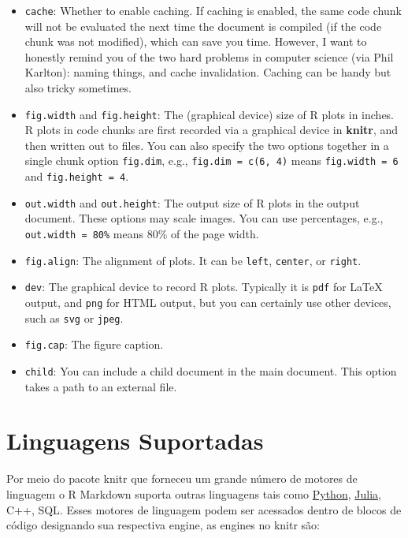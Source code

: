 \documentclass[
]{book}
\begin{document}
\begin{itemize}
\item
  \texttt{cache}: Whether to enable caching. If caching is enabled, the same code chunk will not be evaluated the next time the document is compiled (if the code chunk was not modified), which can save you time. However, I want to honestly remind you of the two hard problems in computer science (via Phil Karlton): naming things, and cache invalidation. Caching can be handy but also tricky sometimes.
\item
  \texttt{fig.width} and \texttt{fig.height}: The (graphical device) size of R plots in inches. R plots in code chunks are first recorded via a graphical device in \textbf{knitr}, and then written out to files. You can also specify the two options together in a single chunk option \texttt{fig.dim}, e.g., \texttt{fig.dim\ =\ c(6,\ 4)} means \texttt{fig.width\ =\ 6} and \texttt{fig.height\ =\ 4}.
\item
  \texttt{out.width} and \texttt{out.height}: The output size of R plots in the output document. These options may scale images. You can use percentages, e.g., \texttt{out.width\ =\ \textquotesingle{}80\%\textquotesingle{}} means 80\% of the page width.
\item
  \texttt{fig.align}: The alignment of plots. It can be \texttt{\textquotesingle{}left\textquotesingle{}}, \texttt{\textquotesingle{}center\textquotesingle{}}, or \texttt{\textquotesingle{}right\textquotesingle{}}.
\item
  \texttt{dev}: The graphical device to record R plots. Typically it is \texttt{\textquotesingle{}pdf\textquotesingle{}} for LaTeX output, and \texttt{\textquotesingle{}png\textquotesingle{}} for HTML output, but you can certainly use other devices, such as \texttt{\textquotesingle{}svg\textquotesingle{}} or \texttt{\textquotesingle{}jpeg\textquotesingle{}}.
\item
  \texttt{fig.cap}: The figure caption.
\item
  \texttt{child}: You can include a child document in the main document. This option takes a path to an external file.
\end{itemize}

\hypertarget{linguagens-suportadas}{%
\section{Linguagens Suportadas}\label{linguagens-suportadas}}

Por meio do pacote knitr que forneceu um grande número de motores de linguagem o R Markdown suporta outras linguagens tais como \href{https://www.python.org/}{Python}, \href{https://julialang.org/}{Julia}, C++, SQL. Esses motores de linguagem podem ser acessados dentro de blocos de código designando sua respectiva engine, as engines no knitr são:
\end{document}

